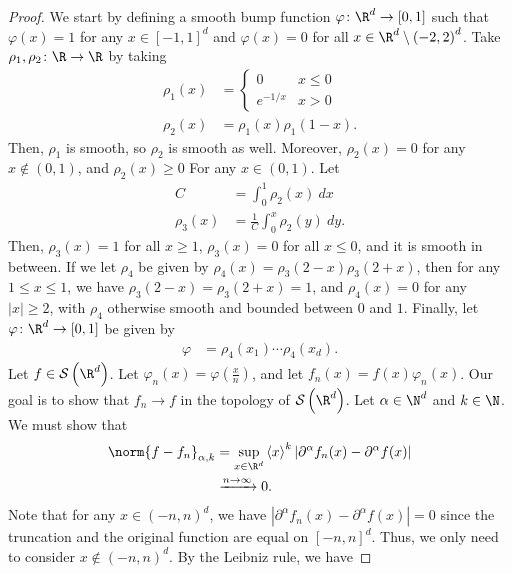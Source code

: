 \documentclass[10pt]{mypackage}
\begin{document}
\begin{proof}
  We start by defining a smooth bump function $\varphi\colon \R^d\rightarrow [0,1]$ such that $\varphi(x) = 1$ for any $x\in [-1,1]^{d}$ and $\varphi(x) = 0$ for all $x\in \R^d\setminus \left( -2,2 \right)^{d}$. Take $\rho_1,\rho_2\colon \R\to\R$ by taking
  \begin{align*}
    \rho_1(x) &= \begin{cases}
      0 & x\leq 0\\
      e^{-1/x} & x > 0
    \end{cases}\\
      \rho_2(x) &= \rho_1(x)\rho_1\left( 1-x \right).
  \end{align*}
  Then, $\rho_1$ is smooth, so $\rho_2$ is smooth as well. Moreover, $\rho_2(x) = 0$ for any $x\notin (0,1)$, and $\rho_2(x) \geq 0$ For any $x\in (0,1)$. Let
  \begin{align*}
    C &= \int_{0}^{1} \rho_2(x)\:dx\\
    \rho_3(x) &= \frac{1}{C}\int_{0}^{x} \rho_2(y)\:dy.
  \end{align*}
  Then, $\rho_3(x) = 1$ for all $x\geq 1$, $\rho_3(x) = 0$ for all $x\leq 0$, and it is smooth in between. If we let $\rho_4$ be given by $\rho_4(x) = \rho_3\left( 2-x \right) \rho_3\left( 2+x \right)$, then for any $1\leq x \leq 1$, we have $\rho_3\left( 2-x \right) = \rho_3\left( 2+x \right) = 1$, and $\rho_4(x) = 0$ for any $\left\vert x \right\vert\geq 2$, with $\rho_4$ otherwise smooth and bounded between $0$ and $1$. Finally, let $\varphi\colon \R^d\rightarrow [0,1]$ be given by
  \begin{align*}
    \varphi &= \rho_4\left( x_1 \right)\cdots \rho_4\left( x_d \right).
  \end{align*}
  Let $f\in \mathcal{S}\left( \R^d \right)$. Let $\varphi_n(x) = \varphi\left( \frac{x}{n} \right)$, and let $f_n(x) = f(x)\varphi_n(x)$. Our goal is to show that $f_n\rightarrow f$ in the topology of $\mathcal{S}\left( \R^d \right)$. Let $\alpha\in \N^d$ and $k\in \N$. We must show that
  \begin{align*}
    \norm{f-f_n}_{\alpha,k} &= \sup_{x\in \R^d} \left\langle x \right\rangle^{k} \left\vert \partial^{\alpha}f_n(x) - \partial^{\alpha}f(x) \right\vert\\
                            &\xrightarrow{n\to \infty} 0.
  \end{align*}
  Note that for any $x\in \left( -n,n \right)^{d}$, we have $\left\vert \partial^{\alpha}f_n(x) - \partial^{\alpha}f(x) \right\vert = 0$ since the truncation and the original function are equal on $\left[ -n,n \right]^{d}$. Thus, we only need to consider $x\notin \left( -n,n \right)^{d}$. By the Leibniz rule, we have

\end{proof}
\end{document}

